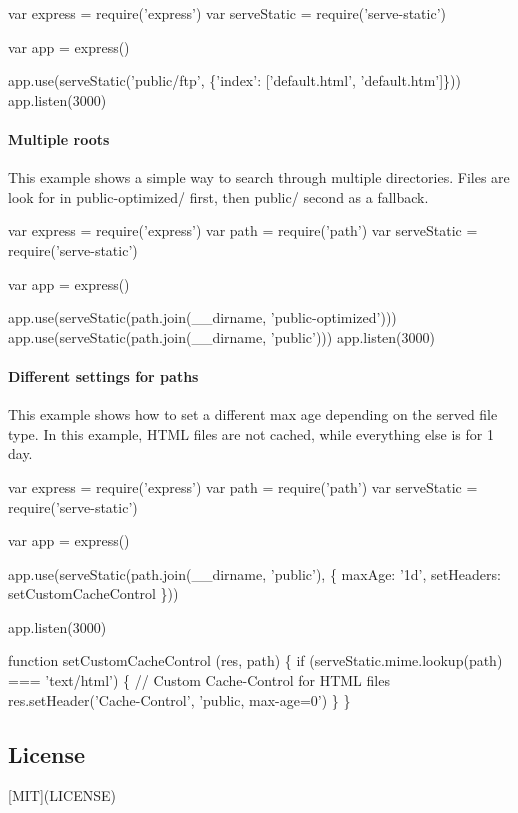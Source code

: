 \begin{DoxyCode}
var express = require('express')
var serveStatic = require('serve-static')

var app = express()

app.use(serveStatic('public/ftp', \{'index': ['default.html', 'default.htm']\}))
app.listen(3000)
\end{DoxyCode}


\paragraph*{Multiple roots}

This example shows a simple way to search through multiple directories. Files are look for in {\ttfamily public-\/optimized/} first, then {\ttfamily public/} second as a fallback.


\begin{DoxyCode}
var express = require('express')
var path = require('path')
var serveStatic = require('serve-static')

var app = express()

app.use(serveStatic(path.join(\_\_dirname, 'public-optimized')))
app.use(serveStatic(path.join(\_\_dirname, 'public')))
app.listen(3000)
\end{DoxyCode}


\paragraph*{Different settings for paths}

This example shows how to set a different max age depending on the served file type. In this example, H\+T\+ML files are not cached, while everything else is for 1 day.


\begin{DoxyCode}
var express = require('express')
var path = require('path')
var serveStatic = require('serve-static')

var app = express()

app.use(serveStatic(path.join(\_\_dirname, 'public'), \{
  maxAge: '1d',
  setHeaders: setCustomCacheControl
\}))

app.listen(3000)

function setCustomCacheControl (res, path) \{
  if (serveStatic.mime.lookup(path) === 'text/html') \{
    // Custom Cache-Control for HTML files
    res.setHeader('Cache-Control', 'public, max-age=0')
  \}
\}
\end{DoxyCode}


\subsection*{License}

\mbox{[}M\+IT\mbox{]}(L\+I\+C\+E\+N\+SE) 